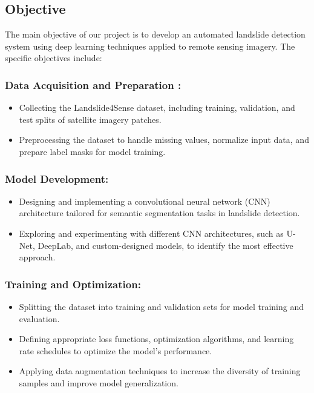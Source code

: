 \documentclass[12pt,a4paper]{report}
\begin{document}
	\subsection{Objective }
	The main objective of our project is to develop an automated landslide detection system using deep learning techniques applied to remote sensing imagery. The specific objectives include:\\

\subsubsection*{Data Acquisition and Preparation :}
\begin{itemize}
    \item Collecting the Landslide4Sense dataset, including training, validation, and test splits of satellite imagery patches. 
    \item  Preprocessing the dataset to handle missing values, normalize input data, and prepare label masks for model training. 
\end{itemize}

 \subsubsection*{Model Development:}
\begin{itemize}
    \item Designing and implementing a convolutional neural network (CNN) architecture tailored for semantic segmentation tasks in landslide detection.  
    \item  Exploring and experimenting with different CNN architectures, such as U-Net, DeepLab, and custom-designed models, to identify the most effective approach.  
\end{itemize}

 \subsubsection*{Training and Optimization:}
\begin{itemize}
    \item Splitting the dataset into training and validation sets for model training and evaluation. 
    \item  Defining appropriate loss functions, optimization algorithms, and learning rate schedules to optimize the model's performance.
    \item Applying data augmentation techniques to increase the diversity of training samples and improve model generalization.
\end{itemize}
\end{document}
